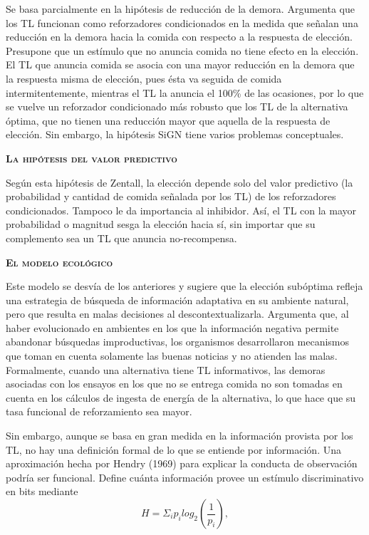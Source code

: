 \documentclass[a4paper,12pt]{article}
\begin{document}
Se basa parcialmente en la hipótesis de reducción de la demora. Argumenta que los TL funcionan como reforzadores condicionados en la medida que señalan una reducción en la demora hacia la comida con respecto a la respuesta de elección. Presupone que un estímulo que no anuncia comida no tiene efecto en la elección. El TL que anuncia comida se asocia con una mayor reducción en la demora que la respuesta misma de elección, pues ésta va seguida de comida intermitentemente, mientras el TL la anuncia el 100\% de las ocasiones, por lo que se vuelve un reforzador condicionado más robusto que los TL de la alternativa óptima, que no tienen una reducción mayor que aquella de la respuesta de elección. Sin embargo, la hipótesis SiGN tiene varios problemas conceptuales.

{\scshape\bfseries La hipótesis del valor predictivo}

Según esta hipótesis de Zentall, la elección depende solo del valor predictivo (la probabilidad y cantidad de comida señalada por los TL) de los reforzadores condicionados. Tampoco le da importancia al inhibidor. Así, el TL con la mayor probabilidad o magnitud sesga la elección hacia sí, sin importar que su complemento sea un TL que anuncia no-recompensa.

{\scshape\bfseries El modelo ecológico}

Este modelo se desvía de los anteriores y sugiere que la elección subóptima refleja una estrategia de búsqueda de información adaptativa en su ambiente natural, pero que resulta en malas decisiones al descontextualizarla. Argumenta que, al haber evolucionado en ambientes en los que la información negativa permite abandonar búsquedas improductivas, los organismos desarrollaron mecanismos que toman en cuenta solamente las buenas noticias y no atienden las malas. Formalmente, cuando una alternativa tiene TL informativos, las demoras asociadas con los ensayos en los que no se entrega comida no son tomadas en cuenta en los cálculos de ingesta de energía de la alternativa, lo que hace que su tasa funcional de reforzamiento sea mayor.

Sin embargo, aunque se basa en gran medida en la información provista por los TL, no hay una definición formal de lo que se entiende por información. Una aproximación hecha por Hendry (1969) para explicar la conducta de observación podría ser funcional. Define cuánta información provee un estímulo discriminativo en bits mediante
$$
H=\Sigma_ip_ilog_2\left(\frac1{p_i}\right),
$$
\end{document}
